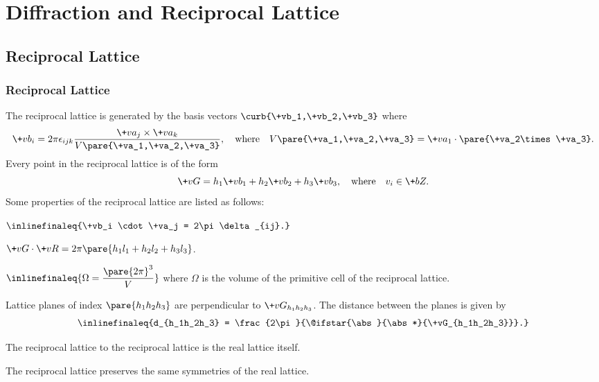 \documentclass[hidelinks]{article}
\makeatletter
\DeclarePairedDelimiter\abs{\lvert}{\rvert}%
\let\oldabs\abs
\def\abs{\@ifstar{\oldabs}{\oldabs*}}
\makeatother
\begin{document}
\section{Diffraction and Reciprocal Lattice} %
\label{sec:crystal_diffraction_and_reciprocal_lattice}

\subsection{Reciprocal Lattice} %
\label{sub:reciprocal_lattice}

\subsubsection{Reciprocal Lattice} %
\label{ssub:reciprocal_lattice}

The reciprocal lattice is generated by the basis vectors $\curb{\+vb_1,\+vb_2,\+vb_3}$ where
\[ \+vb_i = 2\pi \epsilon_{ijk} \frac{\+va_{j}\times \+va_{k}}{V\pare{\+va_1,\+va_2,\+va_3}},\quad \text{where}\quad V\pare{\+va_1,\+va_2,\+va_3} = \+va_1\cdot \pare{\+va_2\times \+va_3}. \]
Every point in the reciprocal lattice is of the form
\[ \+vG = h_1 \+vb_1 + h_2 \+vb_2 + h_3 \+vb_3,\quad \text{where}\quad v_i \in \+bZ. \]
Some properties of the reciprocal lattice are listed as follows:
\begin{cenum}
    \item $\inlinefinaleq{\+vb_i \cdot \+va_j = 2\pi \delta_{ij}.}$
    \item $\+vG\cdot \+vR = 2\pi\pare{h_1 l_1 + h_2 l_2 + h_3 l_3}$.
    \item $\inlinefinaleq{\Omega = \dfrac{\pare{2\pi}^3}{V}}$ where $\Omega$ is the volume of the primitive cell of the reciprocal lattice.
    \item Lattice planes of index $\pare{h_1h_2h_3}$ are perpendicular to $\+vG_{h_1h_2h_3}$. The distance between the planes is given by
    \begin{equation}
        \label{eq:plane_distance}
        \inlinefinaleq{d_{h_1h_2h_3} = \frac{2\pi}{\abs{\+vG_{h_1h_2h_3}}}.}
    \end{equation}
    \item The reciprocal lattice to the reciprocal lattice is the real lattice itself.
    \item The reciprocal lattice preserves the same symmetries of the real lattice.
\end{cenum}

\end{document}
